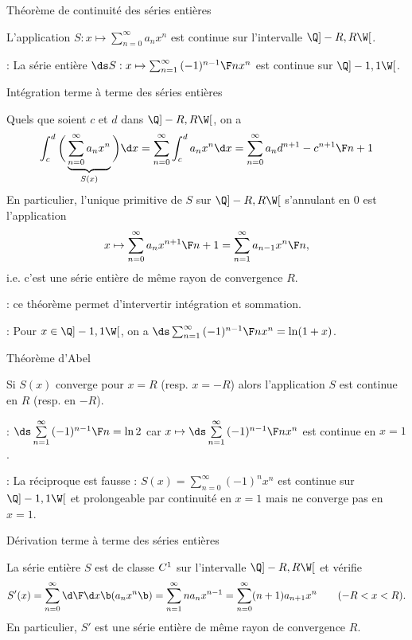 \Concept Théorème de continuité des séries entières

\Theoreme [$\sum_{n=0}^\infty a_n x^n$ de rayon de convergence $R>0$ ou~${R=\infty}$] 
L'application $S:x\mapsto\sum_{n=0}^\infty a_nx^n$ est continue sur l'intervalle $\Q]-R,R\W[$. 

\Application : La série entière $\ds S:x\mapsto\sum_{n=1}^{\infty}{(-1)^{n-1}\F n}x^n$ est continue sur $\Q]-1,1\W[$. 

\Concept Intégration terme à terme des séries entières

\Theoreme [$S=$ de rayon de convergence $R>0$ ou~$R=\infty$] 
Quels que soient $c$ et $d$ dans $\Q]-R,R\W[$, on a 
$$
\int_c^d\bigg(\underbrace{\sum\limits_{n=0}^\infty a_n x^n}_{S(x)}\bigg)\d x=\sum\limits_{n=0}^\infty\int_c^da_n x^n\d x=\sum\limits_{n=0}^\infty a_n{d^{n+1}-c^{n+1}\F n+1}
$$
En particulier, l'unique primitive de $S$ sur $\Q]-R,R\W[$ s'annulant en $0$ est l'application 
$$
x\mapsto\sum_{n=0}^\infty a_n{x^{n+1}\F n+1}=\sum_{n=1}^\infty a_{n-1}{x^n\F n}, 
$$
i.e. c'est une série entière de même rayon de convergence $R$. 

\Remarque : ce théorème permet d'intervertir intégration et sommation. 

\Application : Pour $x\in\Q]-1,1\W[$, on a $\ds \sum_{n=1}^\infty{(-1)^{n-1}\F n}x^n=\ln(1+x)$. 

\Concept Théorème d'Abel

\Theoreme [$S=\sum_{n=0}^\infty a_n x^n$ de rayon de convergence $R>0$] 
Si $S(x)$ converge pour $x=R$ (resp. $x=-R$) alors l'application $S$ est continue en $R$ (resp. en $-R$). 

\Application : $\ds\sum\limits_{n=1}^{\infty}{(-1)^{n-1}\F n}=\ln 2$ car $x\mapsto\ds \sum\limits_{n=1}^\infty{(-1)^{n-1}\F n}x^n$ est continue en $x=1$. 

\Remarque : La réciproque est fausse : $S(x)=\sum_{n=0}^\infty(-1)^nx^n$ est continue sur $\Q]-1,1\W[$ 
et prolongeable par continuité en $x=1$ mais ne converge pas en $x=1$. 

\Concept Dérivation terme à terme des séries entières

\Theoreme [$S=\sum_{n=0}^\infty a_n x^n$ de rayon de convergence $R>0$ ou $R=\infty$] 
La série entière $S$ est de classe $\sc C^1$ sur l'intervalle $\Q]-R,R\W[$ et vérifie 
$$
S'(x)=\sum\limits_{n=0}^\infty{\d\F\d x}\b(a_n x^n\b)=\sum\limits_{n=1}^\infty na_n x^{n-1}=\sum\limits_{n=0}^\infty(n+1)a_{n+1} x^n\qquad(-R<x<R). 
$$
En particulier, $S'$ est une série entière de même rayon de convergence $R$. 

